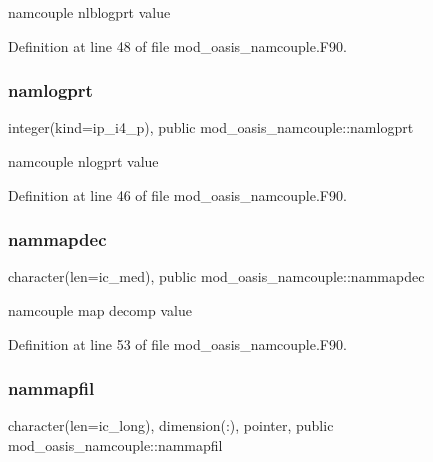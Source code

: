 namcouple nlblogprt value 



Definition at line 48 of file mod\+\_\+oasis\+\_\+namcouple.\+F90.

\mbox{\label{namespacemod__oasis__namcouple_a46affda5336f60a1eeb1badaaccd3cfd}} 
\subsubsection{\texorpdfstring{namlogprt}{namlogprt}}
{\footnotesize\ttfamily integer(kind=ip\+\_\+i4\+\_\+p), public mod\+\_\+oasis\+\_\+namcouple\+::namlogprt}



namcouple nlogprt value 



Definition at line 46 of file mod\+\_\+oasis\+\_\+namcouple.\+F90.

\mbox{\label{namespacemod__oasis__namcouple_a484aaf8a6d7eaa0675a8249fa94509cf}} 
\subsubsection{\texorpdfstring{nammapdec}{nammapdec}}
{\footnotesize\ttfamily character(len=ic\+\_\+med), public mod\+\_\+oasis\+\_\+namcouple\+::nammapdec}



namcouple map decomp value 



Definition at line 53 of file mod\+\_\+oasis\+\_\+namcouple.\+F90.

\mbox{\label{namespacemod__oasis__namcouple_a9fc6ac674a8cfa68d9d15ad13213e21d}} 
\subsubsection{\texorpdfstring{nammapfil}{nammapfil}}
{\footnotesize\ttfamily character(len=ic\+\_\+long), dimension(\+:), pointer, public mod\+\_\+oasis\+\_\+namcouple\+::nammapfil}




